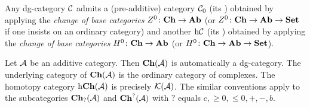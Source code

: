 {Any dg-category ${\cal C}$ admits a (pre-additive) category ${\cal C}_0$ 
(its ) obtained by applying the 
\emph{change of base categories} $Z^0\colon\mathbf{Ch}\to\mathbf{Ab}$ 
(or $Z^0\colon\mathbf{Ch}\to\mathbf{Ab}\to\mathbf{Set}$ if one insists on an ordinary category)
and another $\mathrm{h}{\cal C}$ 
(its ) obtained by applying the 
\emph{change of base categories} $H^0\colon\mathbf{Ch}\to\mathbf{Ab}$
(or $H^0\colon\mathbf{Ch}\to\mathbf{Ab}\to\mathbf{Set}$).
}

\begin{Eg}
Let ${\cal A}$ be an additive category. 
Then $\mathbf{Ch}({\cal A})$ is automatically a dg-category. 
The underlying category of $\mathbf{Ch}({\cal A})$ is 
the ordinary category of complexes. 
The homotopy category $\mathrm{h}\mathbf{Ch}({\cal A})$ is precisely ${\cal K}({\cal A})$.
The similar conventions apply to the subcategories 
$\mathbf{Ch}_{?}({\cal A})$ and $\mathbf{Ch}^{?}({\cal A})$ with 
$?$ equals $c,\ge0,\le0,+,-,b$.
\end{Eg}

